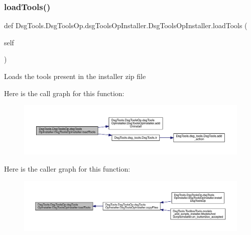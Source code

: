 \subsubsection{\texorpdfstring{load\+Tools()}{loadTools()}}
{\footnotesize\ttfamily def Dsg\+Tools.\+Dsg\+Tools\+Op.\+dsg\+Tools\+Op\+Installer.\+Dsg\+Tools\+Op\+Installer.\+load\+Tools (\begin{DoxyParamCaption}\item[{}]{self }\end{DoxyParamCaption})}

\begin{DoxyVerb}Loads the tools present in the installer zip file
\end{DoxyVerb}
 Here is the call graph for this function\+:
\nopagebreak
\begin{figure}[H]
\begin{center}
\leavevmode
\includegraphics[width=350pt]{class_dsg_tools_1_1_dsg_tools_op_1_1dsg_tools_op_installer_1_1_dsg_tools_op_installer_a03463ead2db9c9505a3339975fb2cfde_cgraph}
\end{center}
\end{figure}
Here is the caller graph for this function\+:
\nopagebreak
\begin{figure}[H]
\begin{center}
\leavevmode
\includegraphics[width=350pt]{class_dsg_tools_1_1_dsg_tools_op_1_1dsg_tools_op_installer_1_1_dsg_tools_op_installer_a03463ead2db9c9505a3339975fb2cfde_icgraph}
\end{center}
\end{figure}
\mbox{\label{class_dsg_tools_1_1_dsg_tools_op_1_1dsg_tools_op_installer_1_1_dsg_tools_op_installer_a4182f7f63775d033eecb6f428fefaf38}} 
